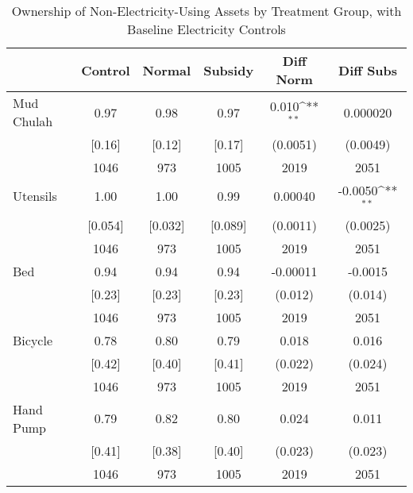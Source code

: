 \begin{table}[htbp]\centering
\def\sym#1{\ifmmode^{#1}\else\(^{#1}\)\fi}
\caption{Ownership of Non-Electricity-Using Assets by Treatment Group, with Baseline Electricity Controls \label{tab:"balance"}}
\begin{tabular*}{0.9\hsize}{@{\hskip\tabcolsep\extracolsep\fill}l*{1}{ccccc}}
\toprule
                                &  Control&   Normal&  Subsidy&Diff Norm         &Diff Subs         \\
\midrule
Mud Chulah                      &     0.97&     0.98&     0.97&    0.010\sym{**} & 0.000020         \\
                                &   [0.16]&   [0.12]&   [0.17]& (0.0051)         & (0.0049)         \\
                                &     1046&      973&     1005&     2019         &     2051         \\
Utensils                        &     1.00&     1.00&     0.99&  0.00040         &  -0.0050\sym{**} \\
                                &  [0.054]&  [0.032]&  [0.089]& (0.0011)         & (0.0025)         \\
                                &     1046&      973&     1005&     2019         &     2051         \\
Bed                             &     0.94&     0.94&     0.94& -0.00011         &  -0.0015         \\
                                &   [0.23]&   [0.23]&   [0.23]&  (0.012)         &  (0.014)         \\
                                &     1046&      973&     1005&     2019         &     2051         \\
Bicycle                         &     0.78&     0.80&     0.79&    0.018         &    0.016         \\
                                &   [0.42]&   [0.40]&   [0.41]&  (0.022)         &  (0.024)         \\
                                &     1046&      973&     1005&     2019         &     2051         \\
Hand Pump                       &     0.79&     0.82&     0.80&    0.024         &    0.011         \\
                                &   [0.41]&   [0.38]&   [0.40]&  (0.023)         &  (0.023)         \\
                                &     1046&      973&     1005&     2019         &     2051         \\

\end{tabular*}
\end{table}

